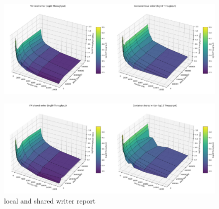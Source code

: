 \begin{figure}[H]
    \centering
    \includegraphics[width=\linewidth]{assets/VM local writer_Container local writer_log_surfaces.png}
        \end{figure}
\begin{figure}[H]
    \centering
    \includegraphics[width=\linewidth]{assets/VM shared writer_Container shared writer_log_surfaces.png}
    \caption{local and shared writer report}
    \label{fig:writer local and shared}
\end{figure}

